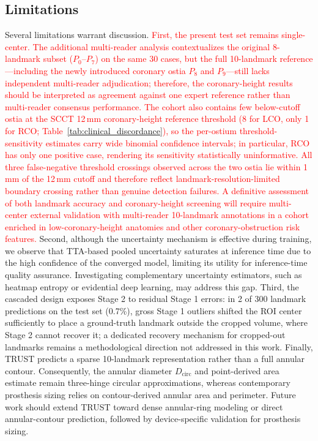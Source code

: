 \documentclass[conference]{IEEEtran}
\begin{document}
\subsection{Limitations}

Several limitations warrant discussion. \textcolor{red}{First, the present test set remains single-center. The additional multi-reader analysis contextualizes the original 8-landmark subset ($P_0$--$P_7$) on the same 30 cases, but the full 10-landmark reference---including the newly introduced coronary ostia $P_8$ and $P_9$---still lacks independent multi-reader adjudication; therefore, the coronary-height results should be interpreted as agreement against one expert reference rather than multi-reader consensus performance.} \textcolor{red}{The cohort also contains few below-cutoff ostia at the SCCT 12\,mm coronary-height reference threshold (8 for LCO, only 1 for RCO; Table~\ref{tab:clinical_discordance}), so the per-ostium threshold-sensitivity estimates carry wide binomial confidence intervals; in particular, RCO has only one positive case, rendering its sensitivity statistically uninformative. All three false-negative threshold crossings observed across the two ostia lie within 1\,mm of the 12\,mm cutoff and therefore reflect landmark-resolution-limited boundary crossing rather than genuine detection failures. A definitive assessment of both landmark accuracy and coronary-height screening will require multi-center external validation with multi-reader 10-landmark annotations in a cohort enriched in low-coronary-height anatomies and other coronary-obstruction risk features.} Second, although the uncertainty mechanism is effective during training, we observe that TTA-based pooled uncertainty saturates at inference time due to the high confidence of the converged model, limiting its utility for inference-time quality assurance. Investigating complementary uncertainty estimators, such as heatmap entropy or evidential deep learning, may address this gap. Third, the cascaded design exposes Stage 2 to residual Stage 1 errors: in 2 of 300 landmark predictions on the test set (0.7\%), gross Stage 1 outliers shifted the ROI center sufficiently to place a ground-truth landmark outside the cropped volume, where Stage 2 cannot recover it; a dedicated recovery mechanism for cropped-out landmarks remains a methodological direction not addressed in this work. Finally, TRUST predicts a sparse 10-landmark representation rather than a full annular contour. Consequently, the annular diameter $D_{\text{circ}}$ and point-derived area estimate remain three-hinge circular approximations, whereas contemporary prosthesis sizing relies on contour-derived annular area and perimeter. Future work should extend TRUST toward dense annular-ring modeling or direct annular-contour prediction, followed by device-specific validation for prosthesis sizing.
\end{document}
